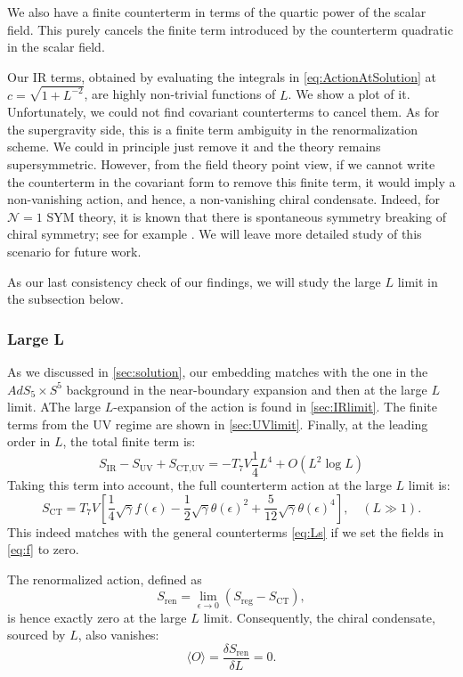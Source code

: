 We also have a finite counterterm in terms of the quartic power of the scalar field. This purely cancels the finite term introduced by the counterterm quadratic in the scalar field. 

Our IR terms, obtained by evaluating the integrals in \eqref{eq:ActionAtSolution} at $c=\sqrt{1+L^{-2}}$, are highly non-trivial functions of $L$. We show a plot of it.
Unfortunately, we could not find covariant counterterms to cancel them. 
As for the supergravity side, this is a finite term ambiguity in the renormalization scheme. 
We could in principle just remove it and the theory remains supersymmetric.
However, from the field theory point view, if we cannot write the counterterm in the covariant form to remove this finite term, it would imply a non-vanishing action, and hence, a non-vanishing chiral condensate. 
Indeed, for $\mathcal{N}=1$ SYM theory, it is known that there is spontaneous symmetry breaking of chiral symmetry; see for example \cite{Bergner:2014saa}. We will leave more detailed study of this scenario for future work.

As our last consistency check of our findings, we will study the large $L$ limit in the subsection below. 

\subsubsection{Large L}
As we discussed in \ref{sec:solution}, our embedding matches with the one in the $AdS_5 \times S^5$ background in the near-boundary expansion and then at the large $L$ limit. 
AThe large $L$-expansion of the action is found in \ref{sec:IRlimit}. 
The finite terms from the UV regime are shown in \ref{sec:UVlimit}.
Finally, at the leading order in $L$, the total finite term is:
\begin{equation} 
S_\text{IR}-S_\text{UV}+S_\text{CT,UV} = - T_7 V \frac{1}{4} L^4 +O(L^2 \log L)
\end{equation}
Taking this term into account, the full counterterm action at the large $L$ limit is:
\begin{equation}\label{eq:counterterms}
 S_\text{CT} =  T_7 V \left[ 
  \frac{1}{4} \sqrt{\gamma} f(\epsilon)
   -\frac{1}{2} \sqrt{\gamma} \theta (\epsilon)^2 + \frac{5}{12} \sqrt{\gamma} \theta (\epsilon)^4
   \right], \quad (L\gg 1).
\end{equation}
This indeed matches with the general counterterms \eqref{eq:Ls} if we set the fields in \eqref{eq:f} to zero.

The renormalized action, defined as
\begin{equation}
 S_\text{ren} = \lim_{\epsilon\rightarrow 0} (S_\text{reg}-S_\text{CT}),
\end{equation}
is hence exactly zero at the large $L$ limit. Consequently, the chiral condensate, sourced by $L$, also vanishes:
\begin{equation} 
\langle O \rangle = \frac{\delta S_\text{ren}}{\delta L} = 0. 
\end{equation}




 




